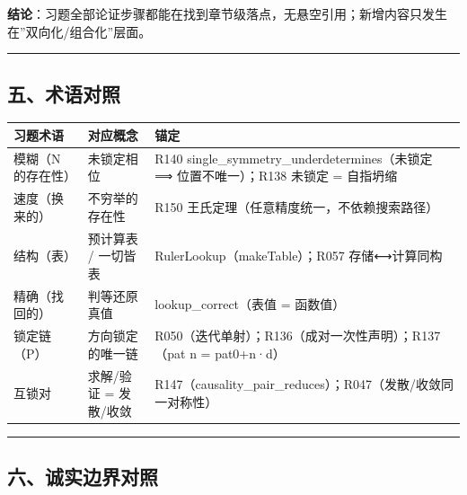 \documentclass[
]{article}
\newcounter{none} %
\begin{document}
\textbf{结论}：习题全部论证步骤都能在找到章节级落点，无悬空引用；新增内容只发生在''双向化/组合化''层面。

\begin{center}\rule{0.5\linewidth}{0.5pt}\end{center}

\subsection{五、术语对照}\label{ux4e94ux672fux8bedux5bf9ux7167}

{\def\LTcaptype{none} %
\begin{longtable}[]{@{}
 >{\raggedright\arraybackslash}p{}
 >{\raggedright\arraybackslash}p{}
 >{\raggedright\arraybackslash}p{}@{}}
\toprule\noalign{}
\begin{minipage}[b]{\linewidth}\raggedright
习题术语
\end{minipage} & \begin{minipage}[b]{\linewidth}\raggedright
对应概念
\end{minipage} & \begin{minipage}[b]{\linewidth}\raggedright
锚定
\end{minipage} \\
\midrule\noalign{}
\endhead
\bottomrule\noalign{}
\endlastfoot
模糊（N 的存在性） & 未锁定相位 & R140
single\_symmetry\_underdetermines（未锁定 ⟹ 位置不唯一）；R138 未锁定 =
自指坍缩 \\
速度（换来的） & 不穷举的存在性 & R150
王氏定理（任意精度统一，不依赖搜索路径） \\
结构（表） & 预计算表 / 一切皆表 & RulerLookup（makeTable）；R057
存储⟷计算同构 \\
精确（找回的） & 判等还原真值 & lookup\_correct（表值 = 函数值） \\
锁定链（P） & 方向锁定的唯一链 &
R050（迭代单射）；R136（成对一次性声明）；R137（pat n = pat0+n·d） \\
互锁对 & 求解/验证 = 发散/收敛 &
R147（causality\_pair\_reduces）；R047（发散/收敛同一对称性） \\
\end{longtable}
}

\begin{center}\rule{0.5\linewidth}{0.5pt}\end{center}

\subsection{六、诚实边界对照}\label{ux516dux8bdaux5b9eux8fb9ux754cux5bf9ux7167}
\end{document}
